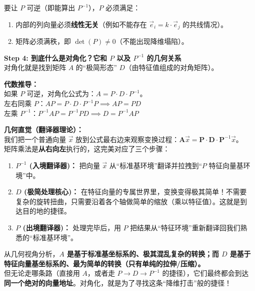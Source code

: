 \documentclass[12pt]{article}
\begin{document}
\begin{flushleft}
    要让 $P$ 可逆（即能算出 $P^{-1}$），$P$ 必须满足：
    \begin{enumerate}
        \item 内部的列向量必须\textbf{线性无关}（例如不能存在 $\vec{e}_i = k \cdot \vec{e}_j$ 的共线情况）。
        \item 矩阵必须满秩，即 \textbf{$\det(P) \neq 0$}（不能出现降维塌陷）。
    \end{enumerate}


    \vspace{0.5em}
    \noindent\textbf{Step 4: 到底什么是对角化？它和 $P$ 以及 $P^{-1}$ 的几何关系} \\
    对角化就是找到矩阵 $A$ 的“极简形态” $D$（由特征值组成的对角矩阵）。

    \textbf{代数推导：} \\
    如果 $P$ 可逆，对角化公式为：$A = P \cdot D \cdot P^{-1}$。\\
    左右同乘 $P$：$AP = P \cdot D \cdot P^{-1} P \implies AP = PD$ \\
    左乘 $P^{-1}$：$P^{-1}AP =  P^{-1}PD \implies D = P^{-1}AP$

    \textbf{几何直觉（翻译器理论）：} \\
    我们把一个普通向量 $\vec{x}$ 放到公式最右边来观察变换过程：$\textbf{A}\vec{x} = \textbf{P} \cdot \textbf{D} \cdot \textbf{P}^{-1} \vec{x}$。\\
    矩阵乘法是\textbf{从右向左}执行的，这完美对应了三个步骤：
    \begin{enumerate}
        \item \textbf{$P^{-1}$ (入境翻译器)：} 把向量 $\vec{x}$ 从“标准基环境”翻译并拉拽到“$P$ 特征向量基环境”中。
        \item \textbf{$D$ (极简处理核心)：} 在特征向量的专属世界里，变换变得极其简单！不需要复杂的旋转扭曲，只需要沿着各个轴做简单的缩放（乘以特征值）。这就是到达目的地的捷径。
        \item \textbf{$P$ (出境翻译器)：} 处理完毕后，用 $P$ 把结果从“特征环境”重新翻译回我们熟悉的“标准基环境”。
    \end{enumerate}

    从几何视角分析，\textbf{$A$ 是基于标准基坐标系的、极其混乱复杂的转换；而 $D$ 是基于特征向量基坐标系的、最为简单的转换（只有单纯的拉伸/压缩）。} \\
    但无论走哪条路（直接用 $A$，或者走 $P \rightarrow D \rightarrow P^{-1}$ 的捷径），它们最终都会到达\textbf{同一个绝对的向量地址}。对角化，就是为了寻找这条“降维打击”般的捷径！


\end{flushleft}
\end{document}
